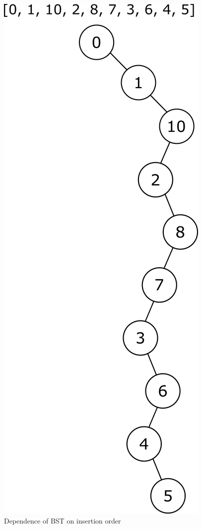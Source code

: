 \begin{figure}[h]
    \includegraphics[scale=0.15]{Images/insertorder2.png}
    \caption{Dependence of BST on insertion order}
    \label{fig:rough_balanced_bst}
\end{figure}

